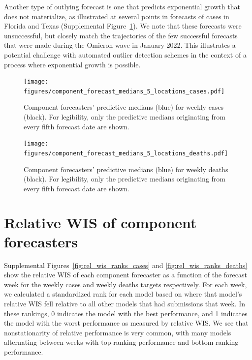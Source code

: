 \documentclass{article}
\begin{document}
Another type of outlying forecast is one that predicts exponential growth that does not materialize, as illustrated at several points in forecasts of cases in Florida and Texas (Supplemental Figure~\ref{fig:component_medians_cases}). We note that these forecasts were unsuccessful, but closely match the trajectories of the few successful forecasts that were made during the Omicron wave in January 2022. This illustrates a potential challenge with automated outlier detection schemes in the context of a process where exponential growth is possible.

\begin{figure}[H]
    \centering
    \texttt{[image: figures/component\_forecast\_medians\_5\_locations\_cases.pdf]}
    \caption{Component forecasters' predictive medians (blue) for weekly cases (black). For legibility, only the predictive medians originating from every fifth forecast date are shown.}
    \label{fig:component_medians_cases}
\end{figure}

\begin{figure}[H]
    \centering
    \texttt{[image: figures/component\_forecast\_medians\_5\_locations\_deaths.pdf]}
    \caption{Component forecasters' predictive medians (blue) for weekly deaths (black). For legibility, only the predictive medians originating from every fifth forecast date are shown.}
    \label{fig:component_medians_deaths}
\end{figure}

\newpage

\section{Relative WIS of component forecasters}

Supplemental Figures~\ref{fig:rel_wis_ranks_cases} and \ref{fig:rel_wis_ranks_deaths} show the relative WIS of each component forecaster as a function of the forecast week for the weekly cases and weekly deaths targets respectively. For each week, we calculated a standardized rank for each model based on where that model's relative WIS fell relative to all other models that had submissions that week. In these rankings, 0 indicates the model with the best performance, and 1 indicates the model with the worst performance as measured by relative WIS. We see that nonstationarity of relative performance is very common, with many models alternating between weeks with top-ranking performance and bottom-ranking performance.
\end{document}
